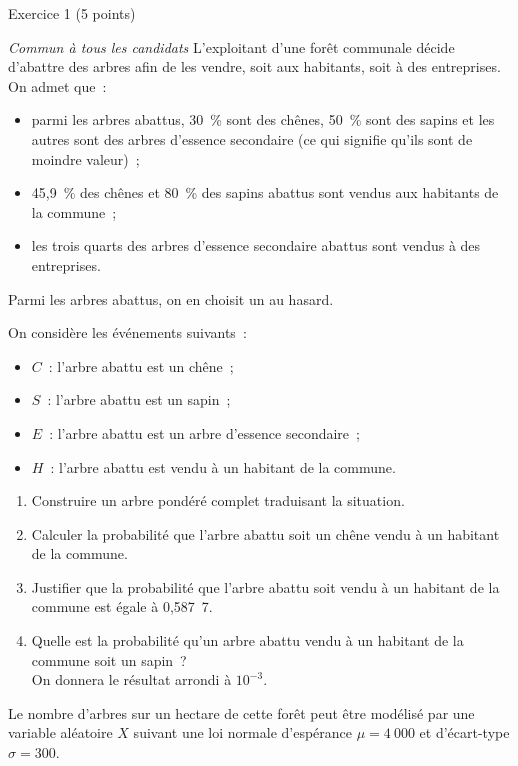 
\begin{h2}Exercice 1 (5 points)\end{h2}
\smallbreak
\textit{Commun à tous les candidats}
\bigbreak
L'exploitant d'une forêt communale décide d'abattre des arbres afin de les vendre, soit aux habitants, soit à des entreprises. On admet que~:
\begin{itemize}
     \item
     parmi les arbres abattus, 30~\% sont des chênes, 50~\% sont des sapins et les autres sont des arbres d'essence secondaire (ce qui signifie qu'ils sont de moindre valeur)~;
     \item 45,9~\% des chênes et 80~\% des sapins abattus sont vendus aux habitants de la commune~;
     \item les trois quarts des arbres d'essence secondaire abattus sont vendus à des entreprises.
\end{itemize}
\medbreak
{}
\smallbreak
Parmi les arbres abattus, on en choisit un au hasard.
\par
On considère les événements suivants~:
\begin{itemize}
     \item $C$~: \og l'arbre abattu est un chêne\fg{}~;
     \item $S$~: \og l'arbre abattu est un sapin\fg{}~;
     \item $E$~: \og l'arbre abattu est un arbre d'essence secondaire\fg{}~;
     \item $H$~: \og l'arbre abattu est vendu à un habitant de la commune\fg{}.
\end{itemize}
\bigbreak
\begin{enumerate}
     \item Construire un arbre pondéré complet traduisant la situation.
     \item Calculer la probabilité que l'arbre abattu soit un chêne  vendu à un habitant de la commune.
     \item Justifier que la probabilité que l'arbre abattu soit vendu à un habitant de la commune est égale à 0,587~7.
     \item Quelle est la probabilité qu'un arbre abattu vendu à un habitant de la commune soit un sapin~?\\On donnera le résultat arrondi  à $10^{-3}$.
     \end{enumerate}
\medbreak
{}
\smallbreak
Le nombre d'arbres sur un hectare de cette forêt peut être modélisé par une variable aléatoire $X$ suivant une loi normale d'espérance $\mu=4~000$ et d'écart-type $\sigma=300$.
